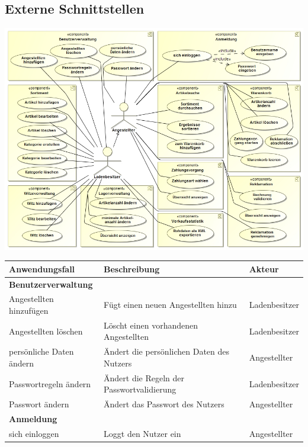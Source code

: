\documentclass[pdftex,12pt,a4paper]{article}
\begin{document}
\subsection{Externe Schnittstellen}
\includegraphics[width=\textwidth]{../Pflichtenheft/images/anwendungsfalldiagramm}
\vspace*{.5cm}
\begin{tabular}{|p{\third}|p{\third}|p{\third}|} \hline
{\textbf{Anwendungsfall}} & {\textbf{Beschreibung}} & {\textbf{Akteur}}\\ \hline
\multicolumn{3}{|l|}{\textbf{Benutzerverwaltung}}\\ \hline
Angestellten hinzuf\"ugen & F\"ugt einen neuen Angestellten hinzu & Ladenbesitzer\\ \hline
Angestellten l\"oschen & L\"oscht einen vorhandenen Angestellten & Ladenbesitzer\\ \hline
pers\"onliche Daten \"andern & \"Andert die pers\"onlichen Daten des Nutzers & Angestellter\\ \hline
Passwortregeln \"andern & \"Andert die Regeln der Passwortvalidierung & Ladenbesitzer\\ \hline
Passwort \"andern & \"Andert das Passwort des Nutzers & Angestellter\\ \hline
\multicolumn{3}{|l|}{\textbf{Anmeldung}}\\ \hline
sich einloggen & Loggt den Nutzer ein & Angestellter\\ \hline
\end{tabular}
\newpage
\end{document}
